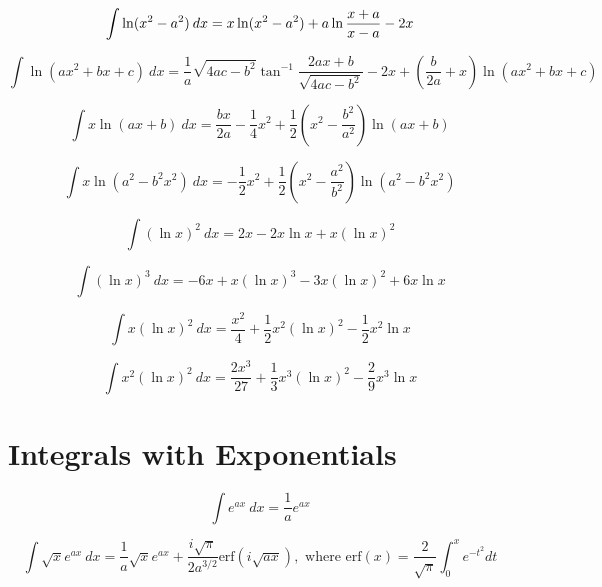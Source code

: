 \documentclass[12pt,a4paper,leqno]{article}
\begin{document}
   \begin{equation}
   \int \ln  ( x^2 - a^2 )\hspace{.5ex} {dx} = x \ln (x^2 - a^2  ) +a\ln \frac{x+a}{x-a} - 2x
   \end{equation}

   \begin{equation}
   \int \ln \left ( ax^2 + bx + c\right) \ dx  = \frac{1}{a}\sqrt{4ac-b^2}\tan^{-1}\frac{2ax+b}{\sqrt{4ac-b^2}}
   -2x + \left( \frac{b}{2a}+x \right )\ln \left (ax^2+bx+c \right)
   \end{equation}

   \begin{equation}
   \int x \ln (ax + b)\ dx = \frac{bx}{2a}-\frac{1}{4}x^2
   +\frac{1}{2}\left(x^2-\frac{b^2}{a^2}\right)\ln (ax+b)
   \end{equation}

   \begin{equation}
   \int x \ln \left ( a^2 - b^2 x^2 \right )\ dx = -\frac{1}{2}x^2+
   \frac{1}{2}\left( x^2 - \frac{a^2}{b^2} \right ) \ln \left (a^2 -b^2 x^2 \right)
   \end{equation}

   \begin{equation}
   \int (\ln x)^2\ dx = 2x - 2x \ln x + x (\ln x)^2
   \end{equation}


   \begin{equation}
   \int (\ln x)^3\ dx = -6 x+x (\ln x)^3-3 x (\ln x)^2+6 x \ln x
   \end{equation}


   \begin{equation}
   \int x (\ln x)^2\ dx = \frac{x^2}{4}+\frac{1}{2} x^2 (\ln x)^2-\frac{1}{2} x^2 \ln x
   \end{equation}

   \begin{equation}
   \int x^2 (\ln x)^2\ dx = \frac{2 x^3}{27}+\frac{1}{3} x^3 (\ln x)^2-\frac{2}{9} x^3 \ln x
   \end{equation}


    \section*{Integrals with Exponentials}

   \begin{equation}
   \int e^{ax}\ dx = \frac{1}{a}e^{ax}
   \end{equation}

   \begin{equation}\label{eq:ajoy}
   \int \sqrt{x} e^{ax}\ dx = \frac{1}{a}\sqrt{x}e^{ax}
   +\frac{i\sqrt{\pi}}{2a^{3/2}}
   \text{erf}\left(i\sqrt{ax}\right),
   \text{ where erf}(x)=\frac{2}{\sqrt{\pi}}\int_0^x e^{-t^2}dt
   \end{equation}
\end{document}
